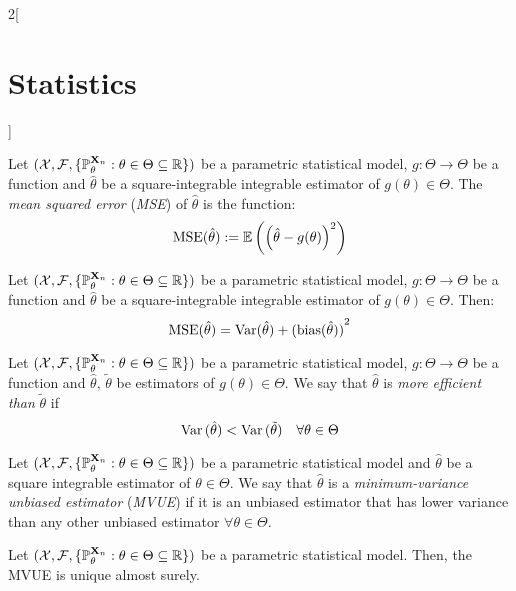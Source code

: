 \documentclass[../../../main.tex]{subfiles}
\begin{document}
\begin{multicols}{2}[\section{Statistics}]
\begin{definition}
    Let $(\mathcal{X},\mathcal{F},\{\mathbb{P}_{\theta}^{\boldsymbol{\mathrm{X}}_n}:{\theta}\in\Theta\subseteq \mathbb{R}\})$ be a parametric statistical model, $g:\Theta\rightarrow\Theta$ be a function and ${\hat\theta}$ be a square-integrable integrable estimator of $g({\theta})\in\Theta$. The \emph{mean squared error} (\emph{MSE}) of ${\hat\theta}$ is the function: $$\operatorname{MSE}({\hat\theta}):=\operatorname{\mathbb{E}}\left({\left({\hat\theta}-g({\theta})\right)}^2\right)$$
  \end{definition}
  \begin{proposition}
    Let $(\mathcal{X},\mathcal{F},\{\mathbb{P}_{\theta}^{\boldsymbol{\mathrm{X}}_n}:{\theta}\in\Theta\subseteq \mathbb{R}\})$ be a parametric statistical model, $g:\Theta\rightarrow\Theta$ be a function and ${\hat\theta}$ be a square-integrable integrable estimator of $g({\theta})\in\Theta$. Then: $$\operatorname{MSE}({\hat\theta})=\operatorname{Var}({\hat\theta})+{(\operatorname{bias}({\hat\theta}))}^2$$
  \end{proposition}
  \begin{definition}
    Let $(\mathcal{X},\mathcal{F},\{\mathbb{P}_{\theta}^{\boldsymbol{\mathrm{X}}_n}:{\theta}\in\Theta\subseteq \mathbb{R}\})$ be a parametric statistical model, $g:\Theta\rightarrow\Theta$ be a function and ${\hat\theta}$, ${\tilde\theta}$ be estimators of $g({\theta})\in\Theta$. We say that ${\hat\theta}$ is \emph{more efficient than} ${\tilde\theta}$ if $$\operatorname{Var}{({\hat\theta})}<\operatorname{Var}{({\tilde\theta})}\quad\forall{\theta}\in\Theta$$
  \end{definition}
  \begin{definition}
    Let $(\mathcal{X},\mathcal{F},\{\mathbb{P}_{\theta}^{\boldsymbol{\mathrm{X}}_n}:{\theta}\in\Theta\subseteq \mathbb{R}\})$ be a parametric statistical model and ${\hat\theta}$ be a square integrable estimator of ${\theta}\in\Theta$. We say that ${\hat\theta}$ is a \emph{minimum-variance unbiased estimator} (\emph{MVUE}) if it is an unbiased estimator that has lower variance than any other unbiased estimator $\forall {\theta}\in\Theta$.
  \end{definition}
  \begin{proposition}
    Let $(\mathcal{X},\mathcal{F},\{\mathbb{P}_{\theta}^{\boldsymbol{\mathrm{X}}_n}:{\theta}\in\Theta\subseteq \mathbb{R}\})$ be a parametric statistical model. Then, the MVUE is unique almost surely.
  \end{proposition}

\end{multicols}
\end{document}
